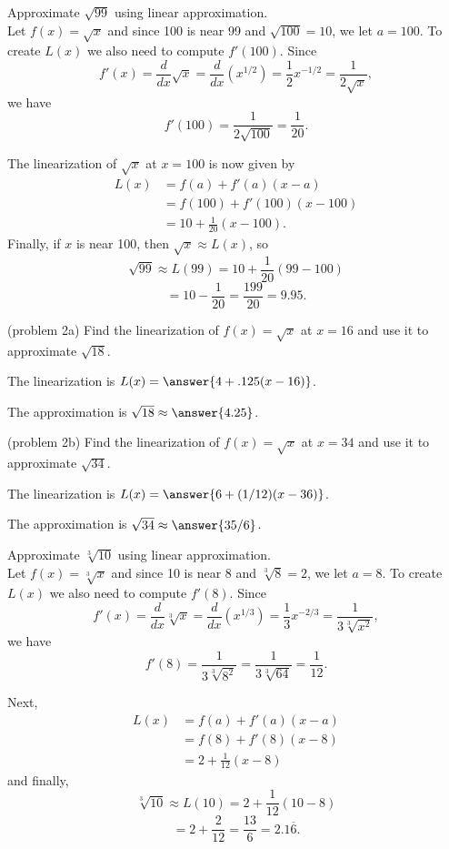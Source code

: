 \documentclass{ximera}
\begin{document}
\begin{example}[example 2]
Approximate $\sqrt{99}$ using linear approximation. \\
Let $f(x) = \sqrt x$ and since 100 is near 99 and $\sqrt{100} = 10$, we let 
$a = 100$. To create $L(x)$ we also need to compute $f'(100)$. 
Since 
\[f'(x) = \frac{d}{dx} \sqrt x = \frac{d}{dx}(x^{1/2})= \frac{1}{2}x^{-1/2}   = \frac{1}{2\sqrt x},\] 
we have
\[f'(100) = \frac{1}{2\sqrt{100}} = \frac{1}{20}.\]

The linearization of $\sqrt x$ at $x=100$ is now given by
\begin{align*}
L(x) &= f(a) + f'(a)(x - a) \\
&= f(100) + f'(100)(x - 100) \\
&= 10 + \frac{1}{20}(x - 100).
\end{align*}
Finally, if $x$ is near 100, then $\sqrt x \approx L(x)$, so
\[\sqrt{99} \approx L(99) = 10 + \frac{1}{20}(99 - 100)\]
\[ = 10 - \frac{1}{20} = \frac{199}{20} = 9.95.\]
\end{example}

\begin{problem}(problem 2a)
Find the linearization of $f(x) = \sqrt x$ at $x = 16$ and use it to approximate $\sqrt{18}$.

The linearization is  $L(x) = \answer{4 + .125 (x-16)}$.

The approximation is $\sqrt{18} \approx \answer{4.25}$.
\end{problem}

\begin{problem}(problem 2b)
Find the linearization of $f(x) = \sqrt x$ at $x = 34$ and use it to approximate $\sqrt{34}$.

The linearization is  $L(x) = \answer{6 + (1/12) (x-36)}$.

The approximation is $\sqrt{34} \approx \answer{35/6}$.
\end{problem}

\begin{example}[example 3]
Approximate $\sqrt[3]{10}$ using linear approximation.\\ 
Let $f(x) = \sqrt[3] x$ and since 10 is near 8 and $\sqrt[3]{8} = 2$, we let 
$a = 8$. To create $L(x)$ we also need to compute $f'(8)$. 
Since 
\[f'(x) = \frac{d}{dx} \sqrt[3] x = \frac{d}{dx}(x^{1/3})= \frac{1}{3}x^{-2/3}   = \frac{1}{3\sqrt[3] {x^2}},\] 
we have
\[f'(8) = \frac{1}{3\sqrt[3]{8^2}} =\frac{1}{3\sqrt[3]{64}}= \frac{1}{12}.\]

Next, 
\begin{align*}
L(x) &= f(a) + f'(a)(x - a) \\
&= f(8) + f'(8)(x - 8) \\
&= 2 + \frac{1}{12}(x - 8)
\end{align*}
and finally,
\[\sqrt[3]{10} \approx L(10) = 2 + \frac{1}{12}(10 - 8)\]
\[ = 2 + \frac{2}{12} = \frac{13}{6} = 2.1{\overline 6}.\]
\end{example}
\end{document}
